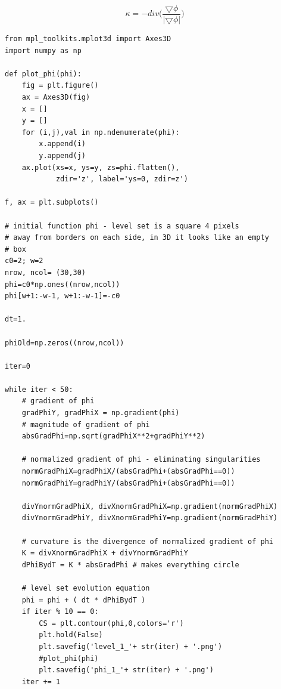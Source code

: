 \documentclass[12pt,fleqn]{article}\usepackage{../../common}
\begin{document}
$$ \kappa = -div \bigg( \frac{\bigtriangledown \phi}
{|\bigtriangledown \phi| } \bigg) $$

\begin{verbatim}
from mpl_toolkits.mplot3d import Axes3D
import numpy as np

def plot_phi(phi):
    fig = plt.figure()
    ax = Axes3D(fig)
    x = []
    y = []
    for (i,j),val in np.ndenumerate(phi):
        x.append(i)
        y.append(j)
    ax.plot(xs=x, ys=y, zs=phi.flatten(), 
            zdir='z', label='ys=0, zdir=z')

f, ax = plt.subplots()

# initial function phi - level set is a square 4 pixels
# away from borders on each side, in 3D it looks like an empty
# box
c0=2; w=2
nrow, ncol= (30,30)
phi=c0*np.ones((nrow,ncol))
phi[w+1:-w-1, w+1:-w-1]=-c0

dt=1.

phiOld=np.zeros((nrow,ncol))

iter=0

while iter < 50:
    # gradient of phi
    gradPhiY, gradPhiX = np.gradient(phi)
    # magnitude of gradient of phi
    absGradPhi=np.sqrt(gradPhiX**2+gradPhiY**2)                               
    
    # normalized gradient of phi - eliminating singularities
    normGradPhiX=gradPhiX/(absGradPhi+(absGradPhi==0))
    normGradPhiY=gradPhiY/(absGradPhi+(absGradPhi==0))
    
    divYnormGradPhiX, divXnormGradPhiX=np.gradient(normGradPhiX)
    divYnormGradPhiY, divXnormGradPhiY=np.gradient(normGradPhiY)
                           
    # curvature is the divergence of normalized gradient of phi
    K = divXnormGradPhiX + divYnormGradPhiY
    dPhiBydT = K * absGradPhi # makes everything circle
    
    # level set evolution equation    
    phi = phi + ( dt * dPhiBydT )
    if iter % 10 == 0: 
        CS = plt.contour(phi,0,colors='r')
        plt.hold(False)
        plt.savefig('level_1_'+ str(iter) + '.png')
        #plot_phi(phi)
        plt.savefig('phi_1_'+ str(iter) + '.png')
    iter += 1
\end{verbatim}
\end{document}
